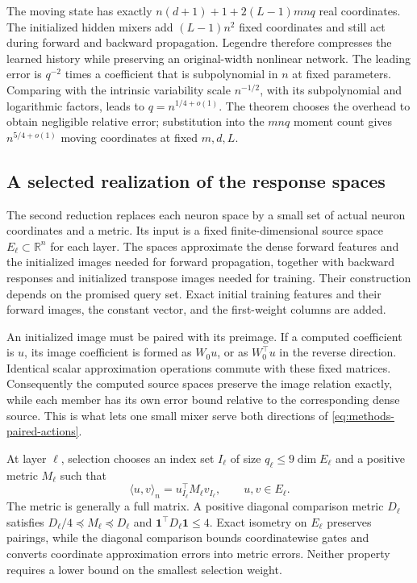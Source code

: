The moving state has exactly $n(d+1)+1+2(L-1)mnq$ real coordinates.
The initialized hidden mixers add $(L-1)n^2$ fixed coordinates and still
act during forward and backward propagation. Legendre therefore compresses
the learned history while preserving an original-width nonlinear network.
The leading error is $q^{-2}$ times a coefficient that is subpolynomial
in $n$ at fixed parameters. Comparing with the intrinsic variability scale
$n^{-1/2}$, with its subpolynomial and logarithmic factors, leads to
$q=n^{1/4+o(1)}$. The theorem chooses the overhead to obtain negligible
relative error; substitution into the $mnq$ moment count gives
$n^{5/4+o(1)}$ moving coordinates at fixed $m,d,L$.

\subsection{A selected realization of the response spaces}
\label{sec:selected-response-model}

The second reduction replaces each neuron space by a small set of actual
neuron coordinates and a metric. Its input is a fixed finite-dimensional
source space $E_\ell\subset\mathbb R^n$ for each layer. The spaces
approximate the dense forward features and the initialized images needed
for forward propagation, together with backward responses and initialized
transpose images needed for training. Their construction depends on the
promised query set. Exact initial training features and their forward
images, the constant vector, and the first-weight columns are added.

An initialized image must be paired with its preimage. If a computed
coefficient is $u$, its image coefficient is formed as $W_0u$, or as
$W_0^\top u$ in the reverse direction. Identical scalar approximation
operations commute with these fixed matrices. Consequently the computed
source spaces preserve the image relation exactly, while each member has
its own error bound relative to the corresponding dense source. This is
what lets one small mixer serve both directions of
\eqref{eq:methods-paired-actions}.

At layer $\ell$, selection chooses an index set $I_\ell$ of size
$q_\ell\le9\dim E_\ell$ and a positive metric $M_\ell$ such that
\begin{equation}
 \langle u,v\rangle_n
 =u_{I_\ell}^\top M_\ell v_{I_\ell},
 \qquad u,v\in E_\ell.
 \label{eq:methods-source-isometry}
\end{equation}
The metric is generally a full matrix. A positive diagonal comparison
metric $D_\ell$ satisfies
$D_\ell/4\preceq M_\ell\preceq D_\ell$ and
$\mathbf1^\top D_\ell\mathbf1\le4$.
Exact isometry on $E_\ell$ preserves pairings, while the diagonal
comparison bounds coordinatewise gates and converts coordinate approximation
errors into metric errors. Neither property requires a lower bound on the
smallest selection weight.

